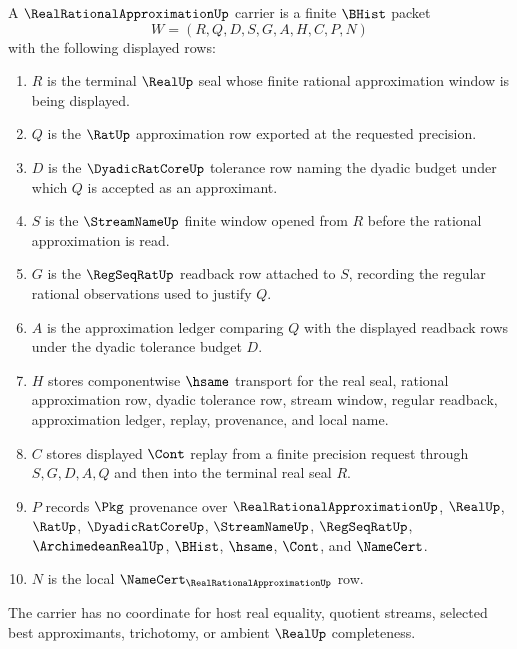 \begin{definition}
\label{def:real-rational-approximation-carrier}
A $\RealRationalApproximationUp$ carrier is a finite $\BHist$ packet
$$
W=(R,Q,D,S,G,A,H,C,P,N)
$$
with the following displayed rows:
\begin{enumerate}
\item $R$ is the terminal $\RealUp$ seal whose finite rational approximation window is being displayed.
\item $Q$ is the $\RatUp$ approximation row exported at the requested precision.
\item $D$ is the $\DyadicRatCoreUp$ tolerance row naming the dyadic budget under which $Q$ is accepted as an approximant.
\item $S$ is the $\StreamNameUp$ finite window opened from $R$ before the rational approximation is read.
\item $G$ is the $\RegSeqRatUp$ readback row attached to $S$, recording the regular rational observations used to justify $Q$.
\item $A$ is the approximation ledger comparing $Q$ with the displayed readback rows under the dyadic tolerance budget $D$.
\item $H$ stores componentwise $\hsame$ transport for the real seal, rational approximation row, dyadic tolerance row, stream window, regular readback, approximation ledger, replay, provenance, and local name.
\item $C$ stores displayed $\Cont$ replay from a finite precision request through $S,G,D,A,Q$ and then into the terminal real seal $R$.
\item $P$ records $\Pkg$ provenance over $\RealRationalApproximationUp$, $\RealUp$, $\RatUp$, $\DyadicRatCoreUp$, $\StreamNameUp$, $\RegSeqRatUp$, $\ArchimedeanRealUp$, $\BHist$, $\hsame$, $\Cont$, and $\NameCert$.
\item $N$ is the local $\NameCert_{\RealRationalApproximationUp}$ row.
\end{enumerate}
The carrier has no coordinate for host real equality, quotient streams, selected best approximants, trichotomy, or ambient $\RealUp$ completeness.
\end{definition}

